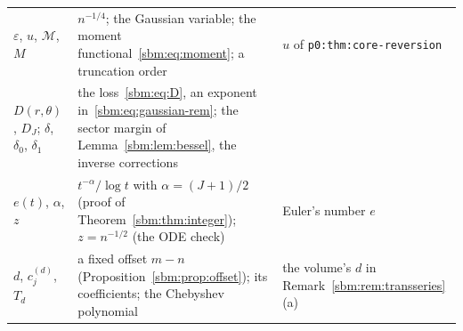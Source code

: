 \documentclass[11pt,letterpaper]{article}
\numberwithin{equation}{section}
\theoremstyle{remark}\newtheorem{remark}[theorem]{Remark}
\newcommand{\file}[1]{\nolinkurl{#1}}
\begin{document}
\begin{minipage}{\textwidth}
\begin{tabular}{@{}>{\raggedright\arraybackslash}p{0.95in}>{\raggedright\arraybackslash}p{3.0in}>{\raggedright\arraybackslash}p{2.15in}@{}}
$\varepsilon$, $u$, $\mathcal M$, $M$ & $n^{-1/4}$; the Gaussian variable; the moment functional~\eqref{sbm:eq:moment}; a truncation order & $u$ of \file{p0:thm:core-reversion}\\
$D(r,\theta)$, $D_J$; $\delta$, $\delta_0$, $\delta_1$ & the loss~\eqref{sbm:eq:D}, an exponent in~\eqref{sbm:eq:gaussian-rem}; the sector margin of Lemma~\ref{sbm:lem:bessel}, the inverse corrections & \\
$e(t)$, $\alpha$, $z$ & $t^{-\alpha}/\log t$ with $\alpha=(J+1)/2$ (proof of Theorem~\ref{sbm:thm:integer}); $z=n^{-1/2}$ (the ODE check) & Euler's number $e$\\
$d$, $c^{(d)}_j$, $T_d$ & a fixed offset $m-n$ (Proposition~\ref{sbm:prop:offset}); its coefficients; the Chebyshev polynomial & the volume's $d$ in Remark~\ref{sbm:rem:transseries}(a)\\
\bottomrule
\end{tabular}
\endgroup
\end{minipage}
\end{document}
